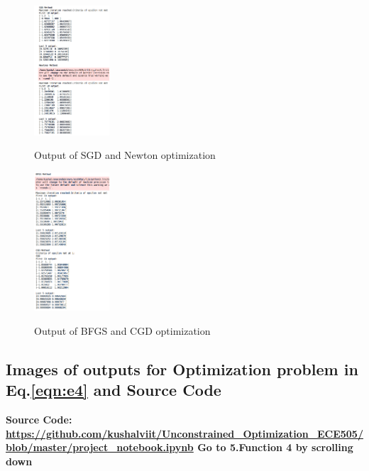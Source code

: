 \documentclass[paper=a4, fontsize=11pt]{scrartcl}
\numberwithin{equation}{section}		%
\numberwithin{figure}{section}			%
\numberwithin{table}{section}				%
\begin{document}
\begin{figure}[H]
\caption{Output of SGD and Newton optimization}
\centering
\includegraphics[width=0.25\textwidth]{out5.png}
\label{out5}
\end{figure}
\begin{figure}[H]
\caption{Output of BFGS and CGD optimization}
\centering
\includegraphics[width=0.25\textwidth]{out6.png}
\label{out6}
\end{figure}
\subsection*{Images of outputs for Optimization problem in Eq.\ref{eqn:e4} and Source Code}
\textbf{Source Code: \url{https://github.com/kushalviit/Unconstrained_Optimization_ECE505/blob/master/project_notebook.ipynb}
Go to 5.Function 4 by scrolling down}
\end{document}
